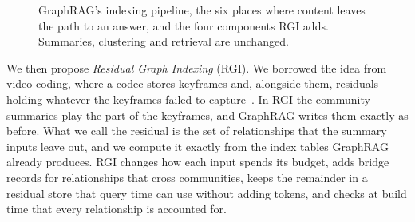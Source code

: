 \documentclass[journal]{IEEEtran}
\theoremstyle{remark}
\begin{document}
\begin{figure}[t]
\caption{GraphRAG's indexing pipeline, the six places where content leaves the path to an answer, and the four components RGI adds. Summaries, clustering and retrieval are unchanged.}
\label{fig:pipeline}
\end{figure}

We then propose \emph{Residual Graph Indexing} (RGI). We borrowed the idea from video coding, where a codec stores keyframes and, alongside them, residuals holding whatever the keyframes failed to capture~\cite{wiegand2003h264}. In RGI the community summaries play the part of the keyframes, and GraphRAG writes them exactly as before. What we call the residual is the set of relationships that the summary inputs leave out, and we compute it exactly from the index tables GraphRAG already produces. RGI changes how each input spends its budget, adds bridge records for relationships that cross communities, keeps the remainder in a residual store that query time can use without adding tokens, and checks at build time that every relationship is accounted for.
\end{document}
